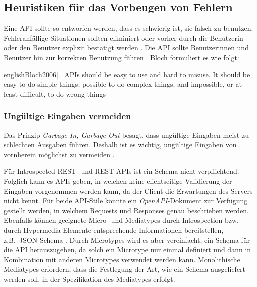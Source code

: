 \subsection{Heuristiken für das Vorbeugen von Fehlern}
Eine API sollte so entworfen werden, dass es schwierig ist, sie falsch zu benutzen. Fehleranfällige Situationen sollten eliminiert oder vorher durch die Benutzerin oder den Benutzer explizit bestätigt werden \autocite{Nielsen1994}. Die API sollte Benutzerinnen und Benutzer hin zur korrekten Benutzung führen \autocite{Myers2016}.
Bloch formuliert es wie folgt:

\begin{foreigndisplaycquote}{english}{Bloch2006}[.]
    APIs should be easy to use and hard to misuse. It should be easy to do simple things; possible to do complex things; and impossible, or at least difficult, to do wrong things
\end{foreigndisplaycquote}

\subsubsection{Ungültige Eingaben vermeiden}
Das Prinzip \emph{Garbage In, Garbage Out} besagt, dass ungültige Eingaben meist zu schlechten Ausgaben führen. Deshalb ist es wichtig, ungültige Eingaben von vornherein möglichst zu vermeiden \autocite[S.~112]{Lidwell2010}.

\para{}Für Introspected-REST- und REST-APIs ist ein Schema nicht verpflichtend. Folglich kann es APIs geben, in welchen keine clientseitige Validierung der Eingaben vorgenommen werden kann, da der Client die Erwartungen des Servers nicht kennt. Für beide API-Stile könnte ein \textit{OpenAPI}-Dokument\footnotemark{} zur Verfügung gestellt werden, in welchem Requests und Responses genau beschrieben werden. Ebenfalls können geeignete Micro- und Mediatypes durch Introspection bzw. durch Hypermedia-Elemente entsprechende Informationen bereitstellen, z.B.\ JSON Schema \autocites{JsonSchemaCore}{JsonSchemaValidation}. Durch Microtypes wird es aber vereinfacht, ein Schema für die API herauszugeben, da solch ein Microtype nur einmal definiert und dann in Kombination mit anderen Microtypes verwendet werden kann. Monolithische Mediatypes erfordern, dass die Festlegung der Art, wie ein Schema ausgeliefert werden soll, in der Spezifikation des Mediatypes erfolgt.


